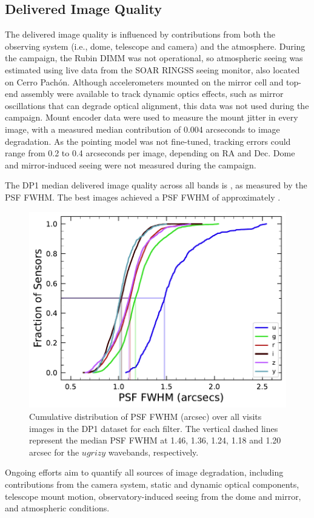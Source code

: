 \subsection{Delivered Image Quality}
\label{ssec:image_quality}
The delivered image quality is influenced by contributions from both the observing system (i.e., dome, telescope and camera) and the atmosphere.
During the campaign, the Rubin \gls{DIMM} was not operational, so atmospheric seeing was estimated using live data from the \gls{SOAR} \gls{RINGSS} seeing monitor, also located on Cerro Pach\'on.
Although accelerometers mounted on the mirror cell and top-end assembly were available to track dynamic optics effects, such as mirror oscillations that can degrade optical alignment, this data was not used during the campaign.
Mount encoder data were used to measure the mount jitter in every image, with a measured median contribution of 0.004 arcseconds to image degradation.
As the pointing model was not fine-tuned, tracking errors could range from 0.2 to 0.4 arcseconds per image, depending on RA and Dec.
Dome and mirror-induced \gls{seeing} were not measured during the campaign.

% 
The DP1 median delivered image quality across all bands is \medianimagequalityallbands, as measured by the \gls{PSF} \gls{FWHM}.
The best images achieved a \gls{PSF} \gls{FWHM} of approximately \bestimagequality.
\begin{figure}[htb!]
\centering
\includegraphics[width=\linewidth]{image_quality_ecdf}
\caption{Cumulative distribution of PSF FWHM (arcsec) over all \nvisitdetectorsummaries visits images in the DP1 dataset for each filter.
The vertical dashed lines represent the median PSF FWHM at 1.46, 1.36, 1.24, 1.18 and 1.20 arcsec for the $ugrizy$ wavebands, respectively.}
\label{fig:delivered_image_quality_ecdf}
\end{figure}
Ongoing efforts aim to quantify all sources of image degradation,  including contributions from the camera system, static and dynamic optical components, telescope mount motion,  observatory-induced seeing from the dome and mirror, and atmospheric conditions.
